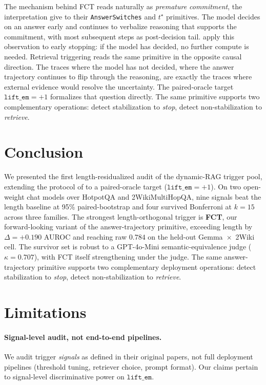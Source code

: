 \documentclass[11pt]{article}
\begin{document}
The mechanism behind FCT reads naturally as \emph{premature commitment}, the interpretation \citet{datta_large_2026} give to their \texttt{AnswerSwitches} and $t^\star$ primitives. The model decides on an answer early and continues to verbalize reasoning that supports the commitment, with most subsequent steps as post-decision tail. \citeauthor{datta_large_2026} apply this observation to early stopping: if the model has decided, no further compute is needed. Retrieval triggering reads the same primitive in the opposite causal direction. The traces where the model has not decided, where the answer trajectory continues to flip through the reasoning, are exactly the traces where external evidence would resolve the uncertainty. The paired-oracle target $\texttt{lift\_em}{=}+1$ formalizes that question directly. The same primitive supports two complementary operations: detect stabilization to \emph{stop}, detect non-stabilization to \emph{retrieve}.

\section{Conclusion}
\label{sec:conclusion}

We presented the first length-residualized audit of the dynamic-RAG trigger pool, extending the protocol of \citet{vashurin_uncertainty-line_2025} to a paired-oracle target ($\texttt{lift\_em}{=}+1$). On two open-weight chat models over HotpotQA and 2WikiMultiHopQA, nine signals beat the length baseline at 95\% paired-bootstrap and four survived Bonferroni at $k{=}15$ across three families. The strongest length-orthogonal trigger is \textbf{FCT}, our forward-looking variant of the answer-trajectory primitive, exceeding length by $\Delta = +0.190$ AUROC and reaching raw $0.784$ on the held-out Gemma~$\times$~2Wiki cell. The survivor set is robust to a GPT-4o-Mini semantic-equivalence judge ($\kappa = 0.707$), with FCT itself strengthening under the judge. The same answer-trajectory primitive supports two complementary deployment operations: detect stabilization to \emph{stop}, detect non-stabilization to \emph{retrieve}.

\section*{Limitations}
\label{sec:limitations}

\paragraph{Signal-level audit, not end-to-end pipelines.} We audit trigger \emph{signals} as defined in their original papers, not full deployment pipelines (threshold tuning, retriever choice, prompt format). Our claims pertain to signal-level discriminative power on $\texttt{lift\_em}$.
\end{document}
